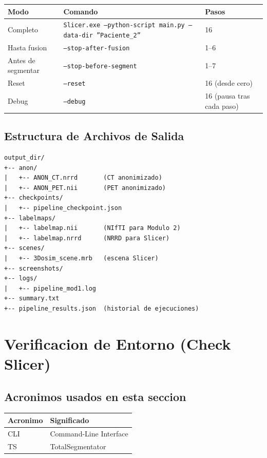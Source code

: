\documentclass[12pt,a4paper]{article}
\begin{document}
\begin{table}[H]
\centering
\small
\begin{tabular}{p{2.8cm} p{7.5cm} p{2.2cm}}
\toprule
\textbf{Modo} & \textbf{Comando} & \textbf{Pasos} \\
\midrule
Completo & \texttt{Slicer.exe --python-script main.py --data-dir ''Paciente\_2''} & 16 \\
Hasta fusion & \texttt{--stop-after-fusion} & 1--6 \\
Antes de segmentar & \texttt{--stop-before-segment} & 1--7 \\
Reset & \texttt{--reset} & 16 (desde cero) \\
Debug & \texttt{--debug} & 16 (pausa tras cada paso) \\
\bottomrule
\end{tabular}
\end{table}

\subsection{Estructura de Archivos de Salida}

\begin{verbatim}
output_dir/
+-- anon/
|   +-- ANON_CT.nrrd       (CT anonimizado)
|   +-- ANON_PET.nii       (PET anonimizado)
+-- checkpoints/
|   +-- pipeline_checkpoint.json
+-- labelmaps/
|   +-- labelmap.nii       (NIfTI para Modulo 2)
|   +-- labelmap.nrrd      (NRRD para Slicer)
+-- scenes/
|   +-- 3Dosim_scene.mrb   (escena Slicer)
+-- screenshots/
+-- logs/
|   +-- pipeline_mod1.log
+-- summary.txt
+-- pipeline_results.json  (historial de ejecuciones)
\end{verbatim}

\newpage

\section{Verificacion de Entorno (Check Slicer)}
\label{sec:check}

\subsection*{Acronimos usados en esta seccion}
\begin{tabular}{ll}
\toprule
\textbf{Acronimo} & \textbf{Significado} \\
\midrule
CLI & Command-Line Interface \\
TS & TotalSegmentator \\
\bottomrule
\end{tabular}
\end{document}

